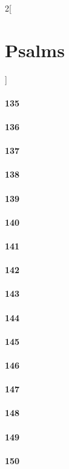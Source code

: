 \documentclass{book}
\begin{document}
\begin{multicols}{2}[\part{Psalms}]
\subsection*{135}
\subsection*{136}
\subsection*{137}
\subsection*{138}
\subsection*{139}
\subsection*{140}
\subsection*{141}
\subsection*{142}
\subsection*{143}
\subsection*{144}
\subsection*{145}
\subsection*{146}
\subsection*{147}
\subsection*{148}
\subsection*{149}
\subsection*{150}
\end{multicols}
\end{document}
